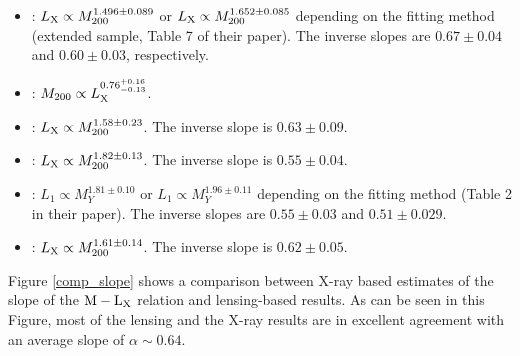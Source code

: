\documentclass[12pt]{emulateapj}
\newcommand{\mlx}{$\rm{M} - \rm{L}_{\rm X}$ }
\begin{document}
\begin{itemize}
\item \citet[][]{Reiprich:2002}: $L_{\rm X} \propto M_{200} ^{1.496\pm
    0.089}$ or $L_{\rm X} \propto M_{200} ^{1.652\pm 0.085}$ depending
  on the fitting method (extended sample, Table 7 of their paper). The
  inverse slopes are $0.67\pm 0.04$ and $0.60\pm 0.03$, respectively.

\item \citet[][]{Allen:2003}: $M_{200} \propto L_{\rm
    X}^{0.76_{-0.13}^{+0.16}}$.
\item \citet[][]{Popesso:2005}: $L_{\rm X} \propto M_{200} ^{1.58\pm
    0.23}$. The inverse slope is $0.63\pm 0.09$.
\item \citet[][]{Chen:2007} : $L_{\rm X} \propto M_{200} ^{1.82\pm
    0.13}$. The inverse slope is $0.55\pm 0.04$.
\item \citet[][]{Pratt:2008}: $L_{1} \propto M_{Y}^{1.81 \pm 0.10}$ or
  $L_{1} \propto M_{Y}^{1.96 \pm 0.11}$ depending on the fitting
  method (Table 2 in their paper). The inverse slopes are
  $0.55 \pm 0.03$ and $0.51 \pm 0.029$.
\item \citet[][]{Vikhlinin:2009}: $L_{\rm X} \propto M_{200} ^{1.61\pm
    0.14}$. The inverse slope is $0.62\pm 0.05$.
\end{itemize}

Figure \ref{comp_slope} shows a comparison between X-ray based
estimates of the slope of the \mlx relation and lensing-based
results. As can be seen in this Figure, most of the lensing and the
X-ray results are in excellent agreement with an average slope of
$\alpha \sim 0.64$.
\end{document}

